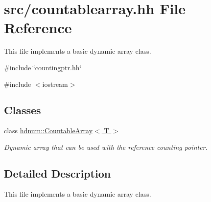 \hypertarget{countablearray_8hh}{
\section{src/countablearray.hh File Reference}
\label{countablearray_8hh}
}


This file implements a basic dynamic array class.  


{\ttfamily \#include \char`\"{}countingptr.hh\char`\"{}}\par
{\ttfamily \#include $<$iostream$>$}\par
\subsection*{Classes}
\begin{DoxyCompactItemize}
\item 
class \hyperlink{classhdnum_1_1CountableArray}{hdnum::CountableArray$<$ T $>$}
\begin{DoxyCompactList}\small\item\em Dynamic array that can be used with the reference counting pointer. \item\end{DoxyCompactList}\end{DoxyCompactItemize}


\subsection{Detailed Description}
This file implements a basic dynamic array class. 